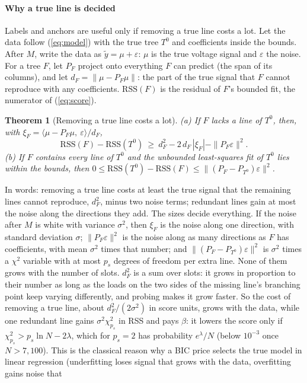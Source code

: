 \documentclass[journal,onecolumn,11pt]{IEEEtran}
\newtheorem{theorem}{Theorem}
\begin{document}
\paragraph*{Why a true line is decided} Labels and anchors are useful only if removing a true line costs a lot. Let the data
follow (\ref{eq:model}) with the true tree $T^0$ and coefficients inside the bounds. After $M$, write the data as
$\tilde y=\mu+\varepsilon$: $\mu$ is the true voltage signal and $\varepsilon$ the noise. For a tree $F$, let $P_F$ project
onto everything $F$ can predict (the span of its columns), and let $d_F=\|\mu-P_F\mu\|$: the part of the true signal that $F$
cannot reproduce with any coefficients. $\mathrm{RSS}(F)$ is the residual of $F$'s bounded fit, the numerator of
(\ref{eq:score}).
\begin{theorem}[Removing a true line costs a lot]\label{thm:cost}
(a) If $F$ lacks a line of $T^0$, then, with $\xi_F=\langle\mu-P_F\mu,\ \varepsilon\rangle/d_F$,
\[
\mathrm{RSS}(F)-\mathrm{RSS}(T^0)\ \ge\ d_F^2-2\,d_F\,|\xi_F|-\|P_F\varepsilon\|^2 .
\]
(b) If $F$ contains every line of $T^0$ and the unbounded least-squares fit of $T^0$ lies within the bounds, then
$0\le\mathrm{RSS}(T^0)-\mathrm{RSS}(F)\le\|(P_F-P_{T^0})\varepsilon\|^2$.
\end{theorem}
In words: removing a true line costs at least the true signal that the remaining lines cannot reproduce, $d_F^2$, minus two
noise terms; redundant lines gain at most the noise along the directions they add. The sizes decide everything. If the noise
after $M$ is white with variance $\sigma^2$, then $\xi_F$ is the noise along one direction, with standard deviation $\sigma$;
$\|P_F\varepsilon\|^2$ is the noise along as many directions as $F$ has coefficients, with mean $\sigma^2$ times that number;
and $\|(P_F-P_{T^0})\varepsilon\|^2$ is $\sigma^2$ times a $\chi^2$ variable with at most $p_s$ degrees of freedom per extra
line. None of them grows with the number of slots. $d_F^2$ is a sum over slots: it grows in proportion to their number as long
as the loads on the two sides of the missing line's branching point keep varying differently, and probing makes it grow
faster. So the cost of removing a true line, about $d_F^2/(2\sigma^2)$ in score units, grows with the data, while one redundant
line gains $\sigma^2\chi^2_{p_s}$ in RSS and pays $\beta$: it lowers the score only if $\chi^2_{p_s}>p_s\ln N-2\lambda$, which
for $p_s=2$ has probability $e^{\lambda}/N$ (below $10^{-3}$ once $N>7{,}100$). This is the classical reason why a BIC price
selects the true model in linear regression (underfitting loses signal that grows with the data, overfitting gains noise that
\end{document}

